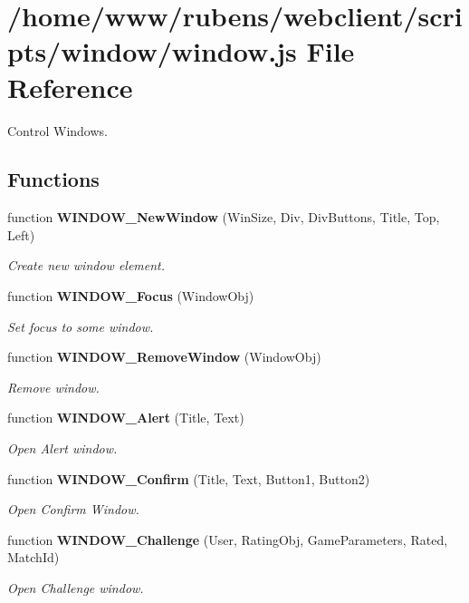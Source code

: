 \section{/home/www/rubens/webclient/scripts/window/window.js File Reference}
\label{window_2window_8js}
Control Windows. 

\subsection*{Functions}
\begin{CompactItemize}
\item 
function {\bf WINDOW\_\-NewWindow} (WinSize, Div, DivButtons, Title, Top, Left)
\begin{CompactList}\small\item\em Create new window element. \item\end{CompactList}\item 
function {\bf WINDOW\_\-Focus} (WindowObj)
\begin{CompactList}\small\item\em Set focus to some window. \item\end{CompactList}\item 
function {\bf WINDOW\_\-RemoveWindow} (WindowObj)
\begin{CompactList}\small\item\em Remove window. \item\end{CompactList}\item 
function {\bf WINDOW\_\-Alert} (Title, Text)
\begin{CompactList}\small\item\em Open Alert window. \item\end{CompactList}\item 
function {\bf WINDOW\_\-Confirm} (Title, Text, Button1, Button2)
\begin{CompactList}\small\item\em Open Confirm Window. \item\end{CompactList}\item 
function {\bf WINDOW\_\-Challenge} (User, RatingObj, GameParameters, Rated, MatchId)
\begin{CompactList}\small\item\em Open Challenge window. \item\end{CompactList}\item 

\end{CompactItemize}

